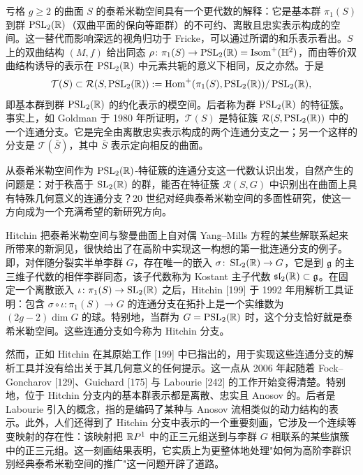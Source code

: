 亏格 $g\ge 2$ 的曲面 $S$ 的泰希米勒空间具有一个更代数的解释：它是基本群 $\pi_1(S)$ 到群 $\operatorname{PSL}_2(\mathbb{R})$（双曲平面的保向等距群）的不可约、离散且忠实表示构成的空间。这一替代而影响深远的视角归功于 Fricke，可以通过所谓的和乐表示看出。$S$ 上的双曲结构 $(M,f)$ 给出同态 $\rho\colon\pi_1(S)\to\operatorname{PSL}_2(\mathbb{R})=\operatorname{Isom}^+(\mathbb{H}^2)$，而由等价双曲结构诱导的表示在 $\operatorname{PSL}_2(\mathbb{R})$ 中元素共轭的意义下相同，反之亦然。于是
\[
\mathcal{T}(S)\subset\mathcal{R}(S,\operatorname{PSL}_2(\mathbb{R})):=\operatorname{Hom}^+(\pi_1(S),\operatorname{PSL}_2(\mathbb{R}))/\operatorname{PSL}_2(\mathbb{R}),
\]
即基本群到群 $\operatorname{PSL}_2(\mathbb{R})$ 的约化表示的模空间。后者称为群 $\operatorname{PSL}_2(\mathbb{R})$ 的特征簇。事实上，如 Goldman 于 1980 年所证明，$\mathcal{T}(S)$ 是特征簇 $\mathcal{R}(S,\operatorname{PSL}_2(\mathbb{R}))$ 中的一个连通分支。它是完全由离散忠实表示构成的两个连通分支之一；另一个这样的分支是 $\mathcal{T}(\bar S)$，其中 $\bar S$ 表示定向相反的曲面。

从泰希米勒空间作为 $\operatorname{PSL}_2(\mathbb{R})$-特征簇的连通分支这一代数认识出发，自然产生的问题是：对于秩高于 $\operatorname{SL}_2(\mathbb{R})$ 的群，能否在特征簇 $\mathcal{R}(S,G)$ 中识别出在曲面上具有特殊几何意义的连通分支？20 世纪对经典泰希米勒空间的多面性研究，使这一方向成为一个充满希望的新研究方向。

Hitchin 把泰希米勒空间与黎曼曲面上自对偶 Yang--Mills 方程的某些解联系起来所带来的新洞见，很快给出了在高阶中实现这一构想的第一批连通分支的例子。即，对伴随分裂实半单李群 $G$，存在唯一的嵌入 $\sigma\colon\operatorname{SL}_2(\mathbb{R})\to G$，它是到 $\mathfrak{g}$ 的主三维子代数的相伴李群同态，该子代数称为 Kostant 主子代数 $\mathfrak{sl}_2(\mathbb{R})\subset\mathfrak{g}$。在固定一个离散嵌入 $\iota\colon\pi_1(S)\to\operatorname{SL}_2(\mathbb{R})$ 之后，Hitchin [199] 于 1992 年用解析工具证明：包含 $\sigma\circ\iota\colon\pi_1(S)\to G$ 的连通分支在拓扑上是一个实维数为 $(2g-2)\dim G$ 的球。特别地，当群为 $G=\operatorname{PSL}_2(\mathbb{R})$ 时，这个分支恰好就是泰希米勒空间。这些连通分支如今称为 Hitchin 分支。


然而，正如 Hitchin 在其原始工作 [199] 中已指出的，用于实现这些连通分支的解析工具并没有给出关于其几何意义的任何提示。这一点从 2006 年起随着 Fock--Goncharov [129]、Guichard [175] 与 Labourie [242] 的工作开始变得清楚。特别地，位于 Hitchin 分支内的基本群表示都是离散、忠实且 Anosov 的。后者是 Labourie 引入的概念，指的是编码了某种与 Anosov 流相类似的动力结构的表示。此外，人们还得到了 Hitchin 分支中表示的一个重要刻画，它涉及一个连续等变映射的存在性：该映射把 $\mathbb{R} P^1$ 中的正三元组送到与李群 $G$ 相联系的某些旗簇中的正三元组。这一刻画结果表明，它实质上为更整体地处理"如何为高阶李群识别经典泰希米勒空间的推广"这一问题开辟了道路。

